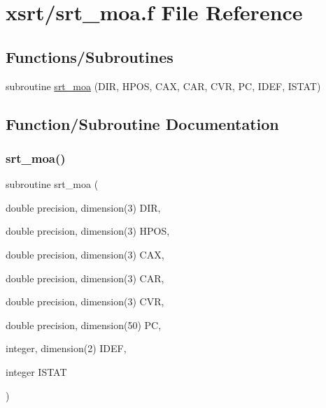 \hypertarget{srt__moa_8f}{}\section{xsrt/srt\+\_\+moa.f File Reference}
\label{srt__moa_8f}
\subsection*{Functions/\+Subroutines}
\begin{DoxyCompactItemize}
\item 
subroutine \hyperlink{srt__moa_8f_a6480d95ea37b30af2a886845ca33af8e}{srt\+\_\+moa} (D\+IR, H\+P\+OS, C\+AX, C\+AR, C\+VR, PC, I\+D\+EF, I\+S\+T\+AT)
\end{DoxyCompactItemize}


\subsection{Function/\+Subroutine Documentation}
\mbox{\label{srt__moa_8f_a6480d95ea37b30af2a886845ca33af8e}} 
\subsubsection{\texorpdfstring{srt\+\_\+moa()}{srt\_moa()}}
{\footnotesize\ttfamily subroutine srt\+\_\+moa (\begin{DoxyParamCaption}\item[{double precision, dimension(3)}]{D\+IR,  }\item[{double precision, dimension(3)}]{H\+P\+OS,  }\item[{double precision, dimension(3)}]{C\+AX,  }\item[{double precision, dimension(3)}]{C\+AR,  }\item[{double precision, dimension(3)}]{C\+VR,  }\item[{double precision, dimension(50)}]{PC,  }\item[{integer, dimension(2)}]{I\+D\+EF,  }\item[{integer}]{I\+S\+T\+AT }\end{DoxyParamCaption})}

